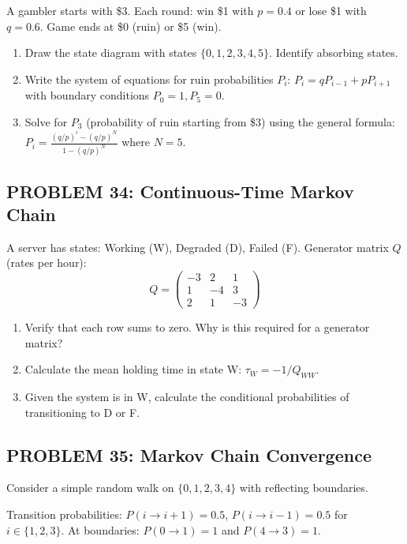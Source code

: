 \documentclass[12pt]{article}
\begin{document}
A gambler starts with \$3. Each round: win \$1 with \(p = 0.4\) or lose \$1 with \(q = 0.6\). Game ends at \$0 (ruin) or \$5 (win).

\begin{enumerate}
\item[(a)] Draw the state diagram with states \(\{0, 1, 2, 3, 4, 5\}\). Identify absorbing states.
\item[(b)] Write the system of equations for ruin probabilities \(P_i\): \(P_i = qP_{i-1} + pP_{i+1}\) with boundary conditions \(P_0 = 1, P_5 = 0\).
\item[(c)] Solve for \(P_3\) (probability of ruin starting from \$3) using the general formula: \(P_i = \frac{(q/p)^i - (q/p)^N}{1 - (q/p)^N}\) where \(N = 5\).
\end{enumerate}

\subsection*{PROBLEM 34: Continuous-Time Markov Chain}

A server has states: Working (W), Degraded (D), Failed (F). Generator matrix \(Q\) (rates per hour):
\[
Q = \begin{pmatrix}
-3 & 2 & 1 \\
1 & -4 & 3 \\
2 & 1 & -3
\end{pmatrix}
\]

\begin{enumerate}
\item[(a)] Verify that each row sums to zero. Why is this required for a generator matrix?
\item[(b)] Calculate the mean holding time in state W: \(\tau_W = -1/Q_{WW}\).
\item[(c)] Given the system is in W, calculate the conditional probabilities of transitioning to D or F.
\end{enumerate}

\subsection*{PROBLEM 35: Markov Chain Convergence}

Consider a simple random walk on \(\{0, 1, 2, 3, 4\}\) with reflecting boundaries.

Transition probabilities: \(P(i \to i+1) = 0.5\), \(P(i \to i-1) = 0.5\) for \(i \in \{1,2,3\}\). At boundaries: \(P(0 \to 1) = 1\) and \(P(4 \to 3) = 1\).
\end{document}
